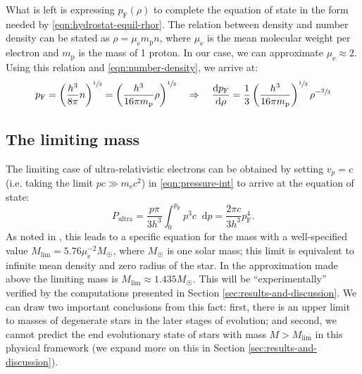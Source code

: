 \documentclass[]{article}
\newcommand{\dd}{\mathop{}\!\mathrm{d}}
\newcommand{\fermiMtm}{p_\mathrm{F}}
\newcommand{\massElectron}{m_\mathrm{e}}
\newcommand{\massProton}{m_\mathrm{p}}
\begin{document}
	What is left is expressing $\fermiMtm (\rho)$ to complete the equation of state in the form needed by \eqref{eqn:hydrostat-equil-rhor}. The relation between density and number density can be stated as $\rho = \mu_\mathrm{e} \massProton n$, where $\mu_\mathrm{e}$ is the mean molecular weight per electron and $\massProton$ is the mass of 1 proton. In our case, we can approximate $\mu_\mathrm{e} \approx 2$. Using this relation and \eqref{eqn:number-density}, we arrive at:
	\begin{equation}\label{eqn:fermi-mtm}
		\fermiMtm = \left( \frac{h^3}{8 \pi} n \right)^{\sfrac{1}{3}} = \left( \frac{h^3}{16 \pi \massProton} \rho\right)^{\sfrac{1}{3}} \quad \Rightarrow \quad \frac{\dd \fermiMtm}{\dd \rho} = \frac{1}{3} \left( \frac{h^3}{16 \pi \massProton}\right)^{\sfrac{1}{3}} \rho^{-\sfrac{2}{3}}
	\end{equation}

\subsection{The limiting mass}
	The limiting case of ultra-relativistic electrons can be obtained by setting $v_p = c$ (i.e. taking the limit $pc \gg \massElectron c^2$) in \eqref{eqn:pressure-int} to arrive at the equation of state:
	\begin{equation}
		P_\mathrm{ultra} = \frac{p \pi}{3 h^3} \int_0^{\fermiMtm} p^3 c \dd p = \frac{2 \pi c}{3 h^3} \fermiMtm^4.
	\end{equation}
	As noted in \cite{Chandrasekhar1984}, this leads to a specific equation for the mass with a well-specified value $M_\mathrm{lim} = 5.76 \mu_{\mathrm{e}}^{-2} M_{\astrosun}$, where $M_{\astrosun}$ is one solar mass; this limit is equivalent to infinite mean density and zero radius of the star. In the approximation made above the limiting mass is $M_\mathrm{lim} \approx 1.435 M_{\astrosun}$. This will be ``experimentally'' verified by the computations presented in Section \ref{sec:results-and-discussion}. We can draw two important conclusions from this fact: first, there is an upper limit to masses of degenerate stars in the later stages of evolution; and second, we cannot predict the end evolutionary state of stars with mass $ M > M_\mathrm{lim}$ in this physical framework (we expand more on this in Section \ref{sec:results-and-discussion}).
\end{document}
